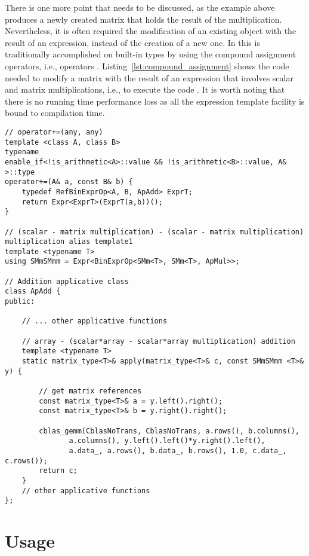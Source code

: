\documentclass[11pt]{article}
\def\ifmonospace{\ifdim\fontdimen3\font=0pt }
\def\C++{\ifmonospace C++\else C\kern-.1667em\raise.50ex\hbox{\tiny{\textbf{+}\kern-.1em\textbf{+}}}\fi \spacefactor1000 }
\newcommand{\code}[1]{{\footnotesize\ttfamily{#1}}}
\begin{document}
There is one more point that needs to be discussed, as the example above produces a newly created matrix that holds the result of the multiplication.
Nevertheless, it is often required the modification of an existing object with the result of an expression, instead of the creation of a new one.
In \C++ this is traditionally accomplished on built-in types by using the compound assignment operators, i.e., operators \code{+=, -=, *=, /=}. Listing~\ref{lst:compound_assignment} shows the code needed to modify a matrix with the result of an expression that involves scalar and matrix multiplications, i.e., to execute the code \code{C += (alpha*A)*(beta*B)}.
It is worth noting that there is no running time performance loss as all the expression template facility is bound to compilation time.
\begin{lstlisting}[caption={Addition compound assignment operator}, label=lst:compound_assignment]
// operator+=(any, any)
template <class A, class B>
typename
enable_if<!is_arithmetic<A>::value && !is_arithmetic<B>::value, A& >::type
operator+=(A& a, const B& b) {
    typedef RefBinExprOp<A, B, ApAdd> ExprT;
    return Expr<ExprT>(ExprT(a,b))();
}

// (scalar - matrix multiplication) - (scalar - matrix multiplication) multiplication alias template1
template <typename T>
using SMmSMmm = Expr<BinExprOp<SMm<T>, SMm<T>, ApMul>>;

// Addition applicative class
class ApAdd {
public:
    
    // ... other applicative functions
    
    // array - (scalar*array - scalar*array multiplication) addition
    template <typename T>
    static matrix_type<T>& apply(matrix_type<T>& c, const SMmSMmm <T>& y) {
        
        // get matrix references
        const matrix_type<T>& a = y.left().right();
        const matrix_type<T>& b = y.right().right();
                
        cblas_gemm(CblasNoTrans, CblasNoTrans, a.rows(), b.columns(),
               a.columns(), y.left().left()*y.right().left(),
               a.data_, a.rows(), b.data_, b.rows(), 1.0, c.data_, c.rows());
        return c;
    }
    // other applicative functions
};
\end{lstlisting}



\section{Usage} \label{sec:usage}
\end{document}
